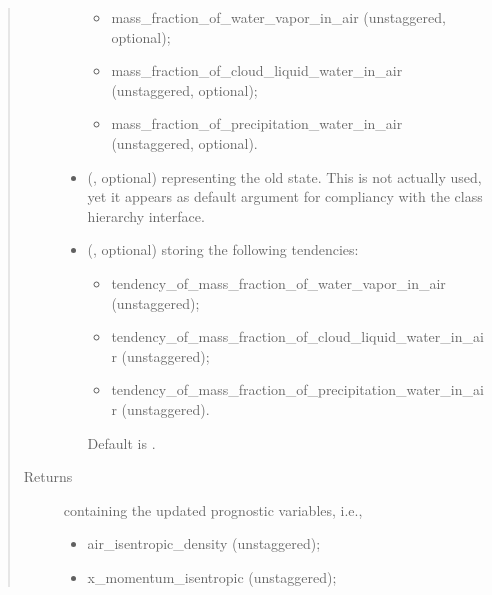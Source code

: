 \documentclass[letterpaper,10pt,english]{sphinxmanual}
\begin{document}
\begin{fulllineitems}
\begin{fulllineitems}
\begin{quote}
\begin{description}
\begin{itemize}
\begin{itemize}
\item {} 
mass\_fraction\_of\_water\_vapor\_in\_air (unstaggered, optional);

\item {} 
mass\_fraction\_of\_cloud\_liquid\_water\_in\_air (unstaggered, optional);

\item {} 
mass\_fraction\_of\_precipitation\_water\_in\_air (unstaggered, optional).

\end{itemize}


\item {} 
 (, optional) \textendash{} {\hyperref[\detokenize{api:storages.state_isentropic.StateIsentropic}]{}} representing the old state.
This is not actually used, yet it appears as default argument for compliancy with
the class hierarchy interface.

\item {} 
 (, optional) \textendash{} 
{\hyperref[\detokenize{api:storages.grid_data.GridData}]{}} storing the following tendencies:
\begin{itemize}
\item {} 
tendency\_of\_mass\_fraction\_of\_water\_vapor\_in\_air (unstaggered);

\item {} 
tendency\_of\_mass\_fraction\_of\_cloud\_liquid\_water\_in\_air (unstaggered);

\item {} 
tendency\_of\_mass\_fraction\_of\_precipitation\_water\_in\_air (unstaggered).

\end{itemize}

Default is .


\end{itemize}

\item[{Returns}] \leavevmode

{\hyperref[\detokenize{api:storages.state_isentropic.StateIsentropic}]{}} containing the updated prognostic variables, i.e.,
\begin{itemize}
\item {} 
air\_isentropic\_density (unstaggered);

\item {} 
x\_momentum\_isentropic (unstaggered);


\end{itemize}
\end{description}
\end{quote}
\end{fulllineitems}
\end{fulllineitems}
\end{document}
